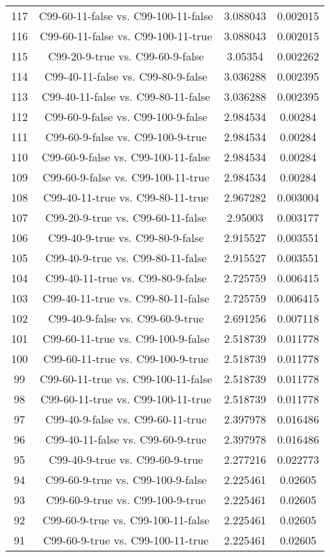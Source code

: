 \documentclass[a4paper,10pt]{article}
\begin{document}
\begin{landscape}
\begin{table}[!htp]
\begin{tabular}{cccc}
117&C99-60-11-false vs. C99-100-11-false&3.088043&0.002015\\
116&C99-60-11-false vs. C99-100-11-true&3.088043&0.002015\\
115&C99-20-9-true vs. C99-60-9-false&3.05354&0.002262\\
114&C99-40-11-false vs. C99-80-9-false&3.036288&0.002395\\
113&C99-40-11-false vs. C99-80-11-false&3.036288&0.002395\\
112&C99-60-9-false vs. C99-100-9-false&2.984534&0.00284\\
111&C99-60-9-false vs. C99-100-9-true&2.984534&0.00284\\
110&C99-60-9-false vs. C99-100-11-false&2.984534&0.00284\\
109&C99-60-9-false vs. C99-100-11-true&2.984534&0.00284\\
108&C99-40-11-true vs. C99-80-11-true&2.967282&0.003004\\
107&C99-20-9-true vs. C99-60-11-false&2.95003&0.003177\\
106&C99-40-9-true vs. C99-80-9-false&2.915527&0.003551\\
105&C99-40-9-true vs. C99-80-11-false&2.915527&0.003551\\
104&C99-40-11-true vs. C99-80-9-false&2.725759&0.006415\\
103&C99-40-11-true vs. C99-80-11-false&2.725759&0.006415\\
102&C99-40-9-false vs. C99-60-9-true&2.691256&0.007118\\
101&C99-60-11-true vs. C99-100-9-false&2.518739&0.011778\\
100&C99-60-11-true vs. C99-100-9-true&2.518739&0.011778\\
99&C99-60-11-true vs. C99-100-11-false&2.518739&0.011778\\
98&C99-60-11-true vs. C99-100-11-true&2.518739&0.011778\\
97&C99-40-9-false vs. C99-60-11-true&2.397978&0.016486\\
96&C99-40-11-false vs. C99-60-9-true&2.397978&0.016486\\
95&C99-40-9-true vs. C99-60-9-true&2.277216&0.022773\\
94&C99-60-9-true vs. C99-100-9-false&2.225461&0.02605\\
93&C99-60-9-true vs. C99-100-9-true&2.225461&0.02605\\
92&C99-60-9-true vs. C99-100-11-false&2.225461&0.02605\\
91&C99-60-9-true vs. C99-100-11-true&2.225461&0.02605\\

\end{tabular}
\end{table}
\end{landscape}
\end{document}
